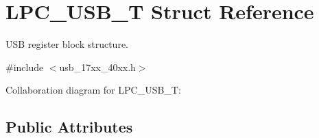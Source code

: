 \hypertarget{structLPC__USB__T}{}\section{L\+P\+C\+\_\+\+U\+S\+B\+\_\+T Struct Reference}
\label{structLPC__USB__T}


U\+SB register block structure.  




{\ttfamily \#include $<$usb\+\_\+17xx\+\_\+40xx.\+h$>$}



Collaboration diagram for L\+P\+C\+\_\+\+U\+S\+B\+\_\+T\+:
\subsection*{Public Attributes}
